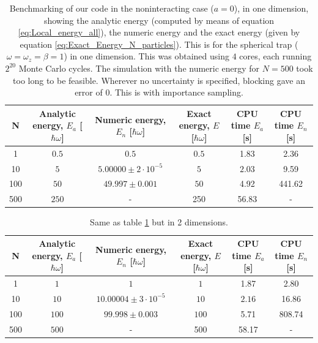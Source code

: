 \documentclass[a4paper, 10pt]{article}
\begin{document}
		 \begin{table}[ht!]
		 	\caption{Benchmarking of our code in the noninteracting case ($a=0$), in one dimension, showing the analytic energy (computed by means of equation \ref{eq:Local_energy_all}), the numeric energy and the exact energy (given by equation \ref{eq:Exact_Energy_N_particles}). This is for the spherical trap ($\omega=\omega_z=\beta=1$) in one dimension. This was obtained using $4$ cores, each running $2^{20}$ Monte Carlo cycles. The simulation with the numeric energy for $N=500$ took too long to be feasible. Wherever no uncertainty is specified, blocking gave an error of $0$. This is with importance sampling.}\label{tab:4.1_benchmark_Green}
			\begin{adjustwidth}{-2cm}{}
				\begin{tabular}{cccccc}
					N & Analytic energy, $E_a$ [$\hbar \omega$] & Numeric energy, $E_n$ [$\hbar \omega$] & Exact energy, $E$ [$\hbar \omega$]& CPU time $E_a$ [s] &CPU time $E_n$ [s]\\
					\hline
					1&$0.5$&$0.5$&$0.5$& 1.83&2.36\\
					10&$5$&$5.00000\pm 2\cdot 10^{-5}$&$5$& $2.03$&9.59\\
					100&$50$&$49.997\pm 0.001$&$50$&4.92&441.62\\
					500&$250$&-&250 &56.83 &-
				\end{tabular}
			\end{adjustwidth}
		\end{table}
		 \begin{table}[ht!]
			 \caption{Same as table \ref{tab:4.1_benchmark_Green} but in 2 dimensions.}\label{tab:4.1_benchmark_Green_2D}
		 	\begin{adjustwidth}{-2cm}{}
		 		\begin{tabular}{cccccc}
		 			N & Analytic energy, $E_a$ [$\hbar \omega$] & Numeric energy, $E_n$ [$\hbar \omega$] & Exact energy, $E$ [$\hbar \omega$]& CPU time $E_a$ [s] &CPU time $E_n$ [s]\\
		 			\hline
		 			1&$1$&$1$&$1$& 1.87&2.80\\
		 			10&$10$&$10.00004\pm 3\cdot 10^{-5}$&$10$& $2.16$&16.86\\
		 			100&$100$&$99.998\pm 0.003$&$100$&5.71&808.74\\
		 			500&$500$&-&500 &58.17 &-
		 		\end{tabular}
		 	\end{adjustwidth}
		 \end{table}
\end{document}
